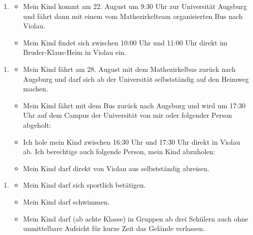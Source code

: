 \documentclass[13pt]{zettel}
\newenvironment{themabox}[1]{%
  \vspace{-0.8em}%
  \begin{enumerate}[labelindent=0pt,labelwidth=2.35cm,itemindent=0em,leftmargin=!,align=left]
    \item[\textbf{#1}]
      \begin{itemize}
}{\end{itemize}\end{enumerate}\vspace{-0.3em}}
\begin{document}
\newpage
\vspace*{-1.5cm}
\enlargethispage{1.0cm}
\small
\singlespacing

\begin{shaded}\begin{themabox}{Anreise}
\item Mein Kind kommt am 22. August um 9:30 Uhr zur Universität Augsburg und fährt dann mit einem vom Mathezirkelteam organisierten Bus nach Violau.
\item Mein Kind findet sich zwischen 10:00 Uhr und 11:00 Uhr direkt im Bruder-Klaus-Heim in Violau ein.
\end{themabox}
\end{shaded}
\vspace{-0.5cm}

\begin{shaded}\begin{themabox}{Abreise}
\item Mein Kind fährt am 28. August mit dem Mathezirkelbus zurück nach Augsburg und darf sich ab der Universität selbstständig auf den Heimweg machen.
\item Mein Kind fährt mit dem Bus zurück nach Augsburg und wird um 17:30 Uhr auf dem Campus der Universität von mir oder folgender Person abgeholt:
\\[0.3cm] \freist{13cm}
\item Ich hole mein Kind zwischen 16:30 Uhr und 17:30 Uhr direkt in Violau ab. Ich berechtige auch folgende Person, mein Kind abzuholen:
\\[0.3cm] \freist{13cm}
\item Mein Kind darf direkt von Violau aus selbstständig abreisen.
\end{themabox}
\end{shaded}

\vspace{-0.5cm}
\begin{shaded}\begin{themabox}{Aktivitäten}
\item Mein Kind darf sich sportlich betätigen.
\item Mein Kind darf schwimmen.
\item Mein Kind darf (ab achte Klasse) in Gruppen ab drei Schülern
auch ohne unmittelbare Aufsicht für kurze Zeit das Gelände verlassen.
\end{themabox}
\end{shaded}
\vspace{-0.5cm}
\end{document}

